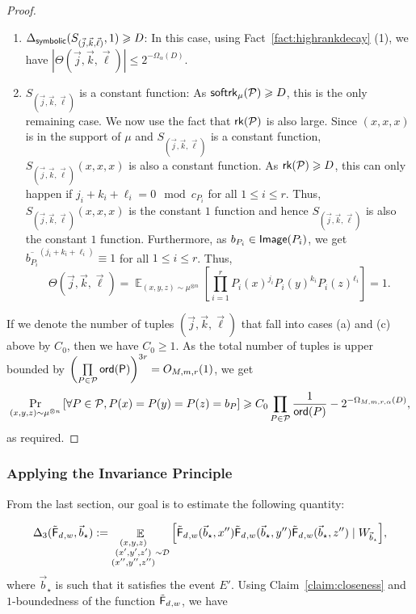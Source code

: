 \documentclass[10pt,a4paper]{amsart}
\newcommand\card[1]{\left| {#1} \right|}
\newcommand\Prob[2]{{\Pr_{#1}\left[ {#2} \right]}}
\newcommand\Expect[2]{{\mathop{\mathbb{E}}_{#1}\left[ {#2} \right]}}
\renewcommand\geq{\geqslant}
\renewcommand\leq{\leqslant}
\newcommand{\V}[1]{{#1}}
\begin{document}
{\begin{proof}
\begin{enumerate}
         \item[(b)] $\Delta_{{\sf symbolic}}(S_{(\vec{j}, \vec{k}, \vec{\ell})},1)\geq D$: In this case, using Fact~\ref{fact:highrankdecay} (1), we have $\card{\Theta(\vec{j}, \vec{k}, \vec{\ell})} \leq 2^{-\Omega_{\alpha}(D)}$.
         
        \item[(c)]  $S_{(\vec{j}, \vec{k}, \vec{\ell})}$ is a constant function: As ${\sf softrk}_{\mu}(\mathcal{P})\geq D$, this is the only remaining case. We now use the fact that ${\sf rk}(\mathcal{P})$ is also large. Since $(x, x, x)$ is in the support of $\mu$ and $S_{(\vec{j}, \vec{k}, \vec{\ell})}$ is a constant function, $S_{(\vec{j}, \vec{k}, \vec{\ell})}(x, x, x)$ is also a constant function. As ${\sf rk}(\mathcal{P})\geq D$, this can only happen if $j_i+k_i+\ell_i = 0 \mod c_{P_{i}}$ for all $1\leq i\leq r$. Thus, $S_{(\vec{j}, \vec{k}, \vec{\ell})}(x, x, x)$ is the constant $1$ function and hence $S_{(\vec{j}, \vec{k}, \vec{\ell})}$ is also the constant $1$ function. Furthermore, as $b_{P_i}\in {\sf Image}(P_i)$, we get $\overline{b_{P_i}}^{(j_i +k_i+\ell_i)}\equiv 1$ for all $1\leq i\leq r$. Thus, 
         $$\Theta(\vec{j}, \vec{k}, \vec{\ell}) =  \Expect{(x,y,z)\sim\mu^{\otimes n}}{\prod_{i=1}^r P_i(x)^{j_i} P_i(y)^{k_i} P_i(z)^{\ell_i}} = 1.$$
     \end{enumerate}
     If we denote the number of tuples $(\vec{j}, \vec{k}, \vec{\ell})$ that fall into cases (a) and (c) above by $C_0$, then we have $C_0\geq 1$. As the total number of tuples is upper bounded by $\left(\prod\limits_{P\in\mathcal{P}} {\sf ord (P)}\right)^{3r} = O_{M, m, r}(1)$, we get 
       \begin{align*}
          \Prob{(x,y,z)\sim\mu^{\otimes n}}{\forall P\in \mathcal{P}, P(x)=P(y)=P(z) = b_P}  \geq C_0\prod\limits_{P\in\mathcal{P}}\frac{1}{{\sf ord}(P)}-2^{-\Omega_{M,m,r,\alpha}(D)},
      \end{align*}
      as required.
    \end{proof}

}\fi


\subsubsection{Applying the Invariance Principle}
\label{sec:apply_invariance_stuff}

From the last section, our goal is to estimate the following quantity:

$$\Delta_3(\truncfcoarsedecoupled_{, \V w}, \vec{b}_\star) := \Expect{\substack{(\V x, \V y, \V z)\\(\V x', \V y', \V z')\\ (\V x'', \V y'', \V z'')}\sim \mathcal{D}}{\truncfcoarsedecoupled_{,\V w}(\vec{b}_\star, \V x'') \truncfcoarsedecoupled_{,\V w}(\vec{b}_\star, \V y'') \truncfcoarsedecoupled_{,\V w}(\vec{b}_\star, \V z'')  \mid W_{\vec{b}_\star}},$$
where $\vec{b}_\star$ is such that it satisfies the event $E'$. Using Claim~\ref{claim:closeness} and $1$-boundedness of the function $\truncfcoarsedecoupled_{,\V w}$, we have
\end{document}
